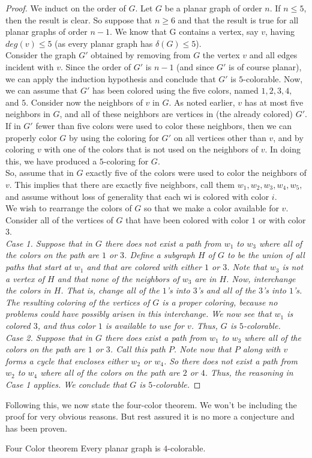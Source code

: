 \documentclass[../basic_graph_theory.tex]{subfiles}
\begin{document}
\begin{proof}
    We induct on the order of $G$. Let $G$ be a planar graph of order $n$. If $n \le 5$, then the result is clear. So suppose that $n \ge 6$ and that the result is true for all planar graphs of order $n - 1$. We know that G contains a vertex, say $v$, having $deg(v) \le 5$ (as every planar graph has $\delta(G) \le 5$).\\
    Consider the graph $G'$ obtained by removing from $G$ the vertex $v$ and all edges incident with $v$. Since the order of $G'$ is $n - 1$ (and since $G'$ is of course planar), we can apply the induction hypothesis and conclude that $G'$ is $5$-colorable. Now, we can assume that $G'$ has been colored using the five colors, named $1,2,3,4,$ and $5$. Consider now the neighbors of $v$ in $G$. As noted earlier, $v$ has at most five neighbors in $G$, and all of these neighbors are vertices in (the already colored) $G'$.\\
    If in $G'$ fewer than five colors were used to color these neighbors, then we can properly color $G$ by using the coloring for $G'$ on all vertices other than $v$, and by coloring $v$ with one of the colors that is not used on the neighbors of $v$. In doing this, we have produced a $5$-coloring for $G$.\\
    So, assume that in $G$ exactly five of the colors were used to color the neighbors of $v$. This implies that there are exactly five neighbors, call them $w_1, w_2, w_3, w_4, w_5,$ and assume without loss of generality that each wi is colored with color $i$.\\
    We wish to rearrange the colors of $G$ so that we make a color available for $v$. Consider all of the vertices of $G$ that have been colored with color $1$ or with color $3$.\\
    \em{Case 1.} Suppose that in $G$ there does not exist a path from $w_1$ to $w_3$ where all of the colors on the path are $1$ or $3$. Define a subgraph $H$ of $G$ to be the union of all paths that start at $w_1$ and that are colored with either $1$ or $3$. Note that $w_3$ is not a vertex of $H$ and that none of the neighbors of $w_3$ are in $H$. Now, interchange the colors in $H$. That is, change all of the $1$'s into $3$'s and all of the $3$'s into $1$'s. The resulting coloring of the vertices of $G$ is a proper coloring, because no problems could have possibly arisen in this interchange. We now see that $w_1$ is colored $3$, and thus color $1$ is available to use for $v$. Thus, $G$ is $5$-colorable.\\
    \em{Case 2.} Suppose that in $G$ there does exist a path from $w_1$ to $w_3$ where all of the colors on the path are $1$ or $3$. Call this path $P$. Note now that $P$ along with $v$ forms a cycle that encloses either $w_2$ or $w_4$. So there does not exist a path from $w_2$ to $w_4$ where all of the colors on the path are $2$ or $4$. Thus, the reasoning in \em{Case 1} applies. We conclude that $G$ is $5$-colorable.
\end{proof}

Following this, we now state the four-color theorem. We won't be including the proof for very obvious reasons. But rest assured it is no more a conjecture and has been proven.
\begin{Thm}{Four Color theorem}{}
    Every planar graph is $4$-colorable.
\end{Thm}
\end{document}

